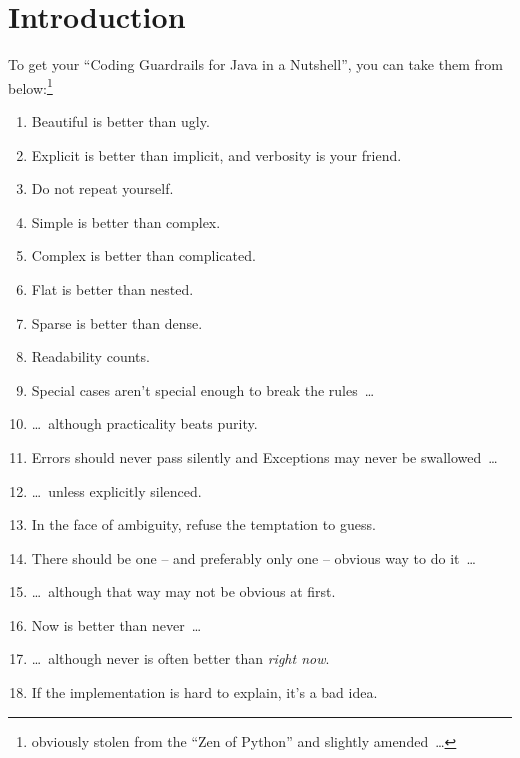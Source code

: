 \documentclass[11pt,a4paper, titlepage, parskip=half, headsepline, footsepline, cleardoublepage=current, headheight=1cm]{scrbook}
\begin{document}
\chapter{Introduction}\label{sec:Introduction}
To get your “Coding Guardrails for Java in a Nutshell”, you can take them from below:\footnote{obviously stolen from the “Zen of Python”\autocite{WIKIPEDIA:ZenOfPython,PYTHON_ORG_MAILING_LIST:ThePythonWay} and slightly amended~…}
\begin{enumerate}[nosep]\label{lst:NutshellGuardrails}
	\item{Beautiful is better than ugly.}\label{lst:ZoP:BeautifulVsUgly}
	\item{Explicit is better than implicit, and verbosity is your friend.}\label{lst:ZoP:ExplicitVsImplicit}
	\item{Do not repeat yourself.}\label{lst:ZoP:DRY}
	\item{Simple is better than complex.}\label{lst:ZoP:SimpleVsComplex}
	\item{Complex is better than complicated.}\label{lst:ZoP:ComplexVsComplicated}
	\item{Flat is better than nested.}\label{lst:ZoP:FlatVsNested}
	\item{Sparse is better than dense.}\label{lst:ZoP:SparseVsDense}
	\item{Readability counts.}\label{lst:ZoP:Readablity}
	\item{Special cases aren't special enough to break the rules~…}\label{lst:ZoP:SpecialCases}
	\item{…~although practicality beats purity.}\label{lst:ZoP:Practicality}
	\item{Errors should never pass silently and Exceptions may never be swallowed~…}\label{lst:ZoP:ErrorsMayNeverBeSwallowed}
	\item{…~unless explicitly silenced.}\label{lst:ZoP:ErrorsAreSilenced}
	\item{In the face of ambiguity, refuse the temptation to guess.}\label{lst:ZoP:DontGuess}
	\item{There should be one – and preferably only one – obvious way to do it~…}\label{lst:ZoP:OneWay}
	\item{…~although that way may not be obvious at first.}
	\item{Now is better than never~…}\label{lst:ZoP:Now}
	\item{…~although never is often better than \textit{right now}.}\label{lst:ZoP:RightNow}
	\item{If the implementation is hard to explain, it's a bad idea.}\label{lst:ZoP:BadIdea}

\end{enumerate}
\end{document}
